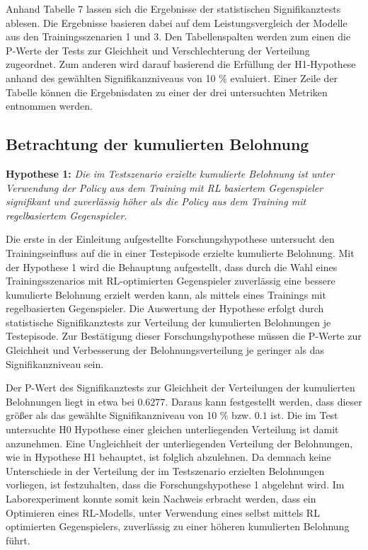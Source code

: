 Anhand Tabelle 7 lassen sich die Ergebnisse der statistischen Signifikanztests ablesen.
Die Ergebnisse basieren dabei auf dem Leistungsvergleich der Modelle aus den Trainingsszenarien 1 und 3.
Den Tabellenspalten werden zum einen die P-Werte der Tests zur Gleichheit und Verschlechterung der Verteilung zugeordnet.
Zum anderen wird darauf basierend die Erfüllung der H1-Hypothese anhand des gewählten Signifikanzniveaus von 10 \% evaluiert.
Einer Zeile der Tabelle können die Ergebnisdaten zu einer der drei untersuchten Metriken entnommen werden.

\subsection{Betrachtung der kumulierten Belohnung}

\textbf{Hypothese 1:}
\textit{Die im Testszenario erzielte kumulierte Belohnung ist unter Verwendung der Policy aus dem Training mit RL basiertem Gegenspieler signifikant und zuverlässig höher als die Policy aus dem Training mit regelbasiertem Gegenspieler.}

Die erste in der Einleitung aufgestellte Forschungshypothese untersucht den Trainingseinfluss auf die in einer Testepisode erzielte kumulierte Belohnung.
Mit der Hypothese 1 wird die Behauptung aufgestellt, dass durch die Wahl eines Trainingsszenarios mit RL-optimierten Gegenspieler zuverlässig eine bessere kumulierte Belohnung erzielt werden kann, als mittels eines Trainings mit regelbasierten Gegenspieler.
Die Auswertung der Hypothese erfolgt durch statistische Signifikanztests zur Verteilung der kumulierten Belohnungen je Testepisode.
Zur Bestätigung dieser Forschungshypothese müssen die P-Werte zur Gleichheit und Verbesserung der Belohnungsverteilung je geringer als das Signifikanzniveau sein. 

Der P-Wert des Signifikanztests zur Gleichheit der Verteilungen der kumulierten Belohnungen liegt in etwa bei $0.6277$.
Daraus kann festgestellt werden, dass dieser größer als das gewählte Signifikanzniveau von 10 \% bzw. $0.1$ ist.
Die im Test untersuchte H0 Hypothese einer gleichen unterliegenden Verteilung ist damit anzunehmen.
Eine Ungleichheit der unterliegenden Verteilung der Belohnungen, wie in Hypothese H1 behauptet, ist folglich abzulehnen.
Da demnach keine Unterschiede in der Verteilung der im Testszenario erzielten Belohnungen vorliegen, ist festzuhalten, dass die Forschungshypothese 1 abgelehnt wird.
Im Laborexperiment konnte somit kein Nachweis erbracht werden, dass ein Optimieren eines RL-Modells, unter Verwendung eines selbst mittels RL optimierten Gegenspielers, zuverlässig zu einer höheren kumulierten Belohnung führt.

